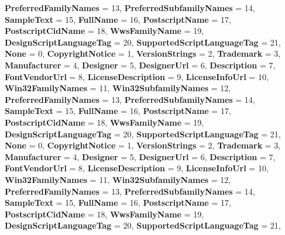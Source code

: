 \begin{DoxyCompactItemize}
{\bfseries Preferred\+Family\+Names} = 13, 
\newline
{\bfseries Preferred\+Subfamily\+Names} = 14, 
{\bfseries Sample\+Text} = 15, 
{\bfseries Full\+Name} = 16, 
{\bfseries Postscript\+Name} = 17, 
\newline
{\bfseries Postscript\+Cid\+Name} = 18, 
{\bfseries Wws\+Family\+Name} = 19, 
{\bfseries Design\+Script\+Language\+Tag} = 20, 
{\bfseries Supported\+Script\+Language\+Tag} = 21, 
\newline
{\bfseries None} = 0, 
{\bfseries Copyright\+Notice} = 1, 
{\bfseries Version\+Strings} = 2, 
{\bfseries Trademark} = 3, 
\newline
{\bfseries Manufacturer} = 4, 
{\bfseries Designer} = 5, 
{\bfseries Designer\+Url} = 6, 
{\bfseries Description} = 7, 
\newline
{\bfseries Font\+Vendor\+Url} = 8, 
{\bfseries License\+Description} = 9, 
{\bfseries License\+Info\+Url} = 10, 
{\bfseries Win32\+Family\+Names} = 11, 
\newline
{\bfseries Win32\+Subfamily\+Names} = 12, 
{\bfseries Preferred\+Family\+Names} = 13, 
{\bfseries Preferred\+Subfamily\+Names} = 14, 
{\bfseries Sample\+Text} = 15, 
\newline
{\bfseries Full\+Name} = 16, 
{\bfseries Postscript\+Name} = 17, 
{\bfseries Postscript\+Cid\+Name} = 18, 
{\bfseries Wws\+Family\+Name} = 19, 
\newline
{\bfseries Design\+Script\+Language\+Tag} = 20, 
{\bfseries Supported\+Script\+Language\+Tag} = 21, 
{\bfseries None} = 0, 
{\bfseries Copyright\+Notice} = 1, 
\newline
{\bfseries Version\+Strings} = 2, 
{\bfseries Trademark} = 3, 
{\bfseries Manufacturer} = 4, 
{\bfseries Designer} = 5, 
\newline
{\bfseries Designer\+Url} = 6, 
{\bfseries Description} = 7, 
{\bfseries Font\+Vendor\+Url} = 8, 
{\bfseries License\+Description} = 9, 
\newline
{\bfseries License\+Info\+Url} = 10, 
{\bfseries Win32\+Family\+Names} = 11, 
{\bfseries Win32\+Subfamily\+Names} = 12, 
{\bfseries Preferred\+Family\+Names} = 13, 
\newline
{\bfseries Preferred\+Subfamily\+Names} = 14, 
{\bfseries Sample\+Text} = 15, 
{\bfseries Full\+Name} = 16, 
{\bfseries Postscript\+Name} = 17, 
\newline
{\bfseries Postscript\+Cid\+Name} = 18, 
{\bfseries Wws\+Family\+Name} = 19, 
{\bfseries Design\+Script\+Language\+Tag} = 20, 
{\bfseries Supported\+Script\+Language\+Tag} = 21, 

\end{DoxyCompactItemize}
